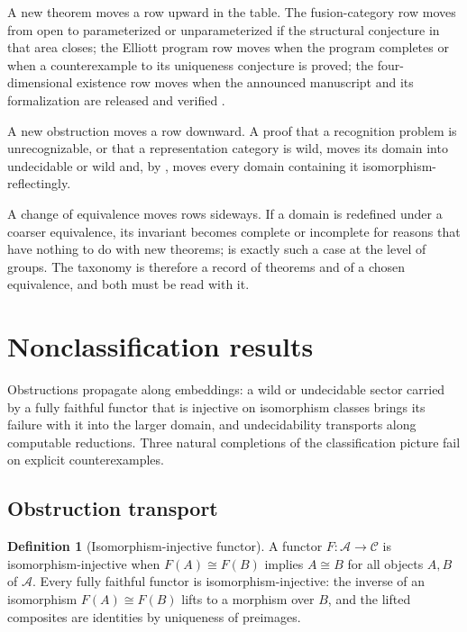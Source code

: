 \documentclass[11pt,letterpaper]{article}
\theoremstyle{definition}
\newtheorem{definition}[theorem]{Definition}
\theoremstyle{remark}
\begin{document}
A new theorem moves a row upward in the table. The fusion-category row moves from open to parameterized or unparameterized if the structural conjecture in that area closes; the Elliott program row moves when the program completes or when a counterexample to its uniqueness conjecture is proved; the four-dimensional existence row moves when the announced manuscript and its formalization are released and verified \cite{openai,kitp,cstarwiki,fusionnlab}.

A new obstruction moves a row downward. A proof that a recognition problem is unrecognizable, or that a representation category is wild, moves its domain into undecidable or wild and, by , moves every domain containing it isomorphism-reflectingly.

A change of equivalence moves rows sideways. If a domain is redefined under a coarser equivalence, its invariant becomes complete or incomplete for reasons that have nothing to do with new theorems;  is exactly such a case at the level of groups. The taxonomy is therefore a record of theorems and of a chosen equivalence, and both must be read with it.

\section{Nonclassification results}

Obstructions propagate along embeddings: a wild or undecidable sector carried by a fully faithful functor that is injective on isomorphism classes brings its failure with it into the larger domain, and undecidability transports along computable reductions. Three natural completions of the classification picture fail on explicit counterexamples.

\subsection{Obstruction transport}

\begin{definition}[Isomorphism-injective functor]
\label{def:injfun}
A functor $F: \mathcal{A} \to \mathcal{C}$ is isomorphism-injective when $F(A) \cong F(B)$ implies $A \cong B$ for all objects $A, B$ of $\mathcal{A}$. Every fully faithful functor is isomorphism-injective: the inverse of an isomorphism $F(A) \cong F(B)$ lifts to a morphism over $B$, and the lifted composites are identities by uniqueness of preimages.
\end{definition}
\end{document}
